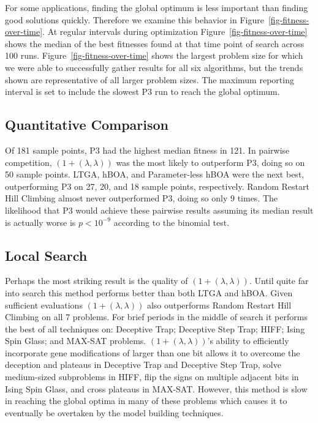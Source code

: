 For some applications, finding the global optimum is less important than finding good solutions quickly. Therefore
we examine this behavior in Figure~\ref{fig-fitness-over-time}. At regular intervals during optimization
Figure~\ref{fig-fitness-over-time} shows the median of the best
fitnesses found at that time point of search across 100 runs.
Figure~\ref{fig-fitness-over-time} shows the largest problem size for which we were able to successfully gather results
for all six algorithms, but the trends shown are representative of all larger problem sizes. The maximum reporting interval
is set to include the slowest P3 run to reach the global optimum.


\subsection{Quantitative Comparison}
Of 181 sample points, P3 had the highest median fitness in 121. In pairwise competition, $(1+(\lambda, \lambda))$
was the most likely to outperform P3, doing so on 50 sample points. LTGA, hBOA, and Parameter-less hBOA
were the next best, outperforming P3 on 27, 20, and 18 sample points, respectively. Random Restart Hill Climbing almost
never outperformed P3, doing so only 9 times.
The likelihood that P3 would achieve these pairwise results assuming its median result is actually worse is $p < 10^{-9}$
according to the binomial test.

\subsection{Local Search}
Perhaps the most striking result is the quality of $(1+(\lambda, \lambda))$. Until quite far into search this
method performs better than both LTGA and hBOA. Given sufficient evaluations $(1+(\lambda, \lambda))$ also outperforms
Random Restart Hill Climbing on all 7 problems. For brief periods in the middle of search it performs the
best of all techniques on: Deceptive Trap; Deceptive Step Trap; HIFF; Ising Spin Glass; and MAX-SAT problems.
$(1+(\lambda, \lambda))$'s ability to efficiently incorporate gene modifications of larger
than one bit allows it to overcome the deception and plateaus in Deceptive Trap and Deceptive Step Trap, solve medium-sized subproblems
in HIFF, flip the signs on multiple adjacent bits in Ising Spin Glass, and cross plateaus in MAX-SAT. However,
this method is slow in reaching the global optima in many of these problems which causes it to eventually
be overtaken by the model building techniques.

